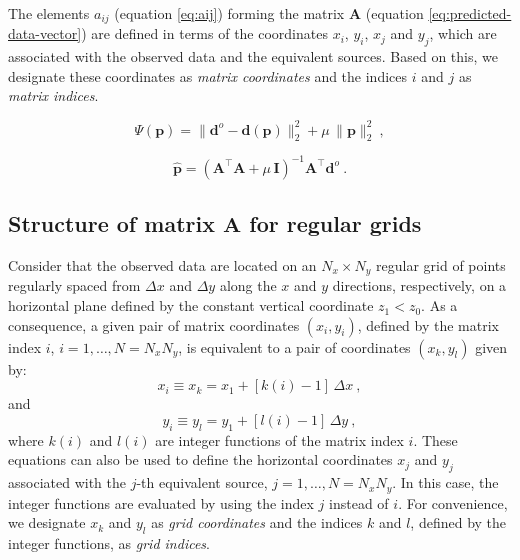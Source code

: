 \documentclass[manuscript,revised]{geophysics}
\begin{document}
The elements $a_{ij}$ (equation \ref{eq:aij}) forming the matrix 
$\mathbf{A}$ (equation \ref{eq:predicted-data-vector}) are defined in terms of the 
coordinates $x_{i}$, $y_{i}$, $x_{j}$ and $y_{j}$, which are associated with the
observed data and the equivalent sources.
Based on this, we designate these coordinates as \textit{matrix coordinates} and the 
indices $i$ and $j$ as \textit{matrix indices}.

\begin{equation}
\Psi(\mathbf{p}) = \| \mathbf{d}^{o} - \mathbf{d(p)} \|_{2}^{2} + 
\mu \, \| \mathbf{p} \|_{2}^{2} \: ,
\label{eq:goal-function}
\end{equation}

\begin{equation}
\hat{\mathbf{p}} = \left( \mathbf{A}^{\top}\mathbf{A} + 
\mu \, \mathbf{I} \right)^{-1}
\mathbf{A}^{\top} \mathbf{d}^{o} \: .
\label{eq:estimated-p-parameter-space}
\end{equation}


\subsection{Structure of matrix $\mathbf{A}$ for regular grids}

Consider that the observed data are located on an $N_{x} \times N_{y}$ regular grid of
points regularly spaced from $\Delta x$ and $\Delta y$ along the $x$ and $y$ directions,
respectively, on a horizontal plane defined by the constant vertical coordinate $z_{1} < z_{0}$. 
As a consequence, a given pair of matrix coordinates $(x_{i}, y_{i})$, defined by the matrix index 
$i$, $i = 1, \dots, N = N_{x} N_{y}$, is equivalent to a pair of coordinates $(x_{k}, y_{l})$
given by:
\begin{equation}
x_{i} \equiv x_{k} = x_{1} + \left[ k(i) - 1 \right] \, \Delta x \: , 
\label{eq:xi}
\end{equation}
and
\begin{equation}
y_{i} \equiv y_{l} = y_{1} + \left[ l(i) - 1 \right] \, \Delta y \: ,
\label{eq:yi}
\end{equation}
where $k(i)$ and $l(i)$ are integer functions of the matrix index $i$.
These equations can also be used to define the horizontal coordinates 
$x_{j}$ and $y_{j}$ associated with the $j$-th equivalent source,
$j = 1, \dots, N = N_{x}N_{y}$. In this case, the integer functions
are evaluated by using the index $j$ instead of $i$.
For convenience, we designate $x_{k}$ and $y_{l}$ as \textit{grid coordinates}
and the indices $k$ and $l$, defined by the integer functions, as
\textit{grid indices}.
\end{document}

